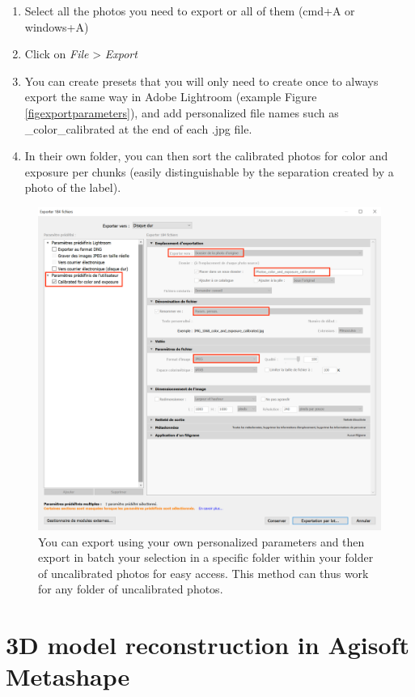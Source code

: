 \documentclass[
]{book}
\begin{document}
\begin{enumerate}
\def\labelenumi{\arabic{enumi}.}
\item
  Select all the photos you need to export or all of them (cmd+A or
  windows+A)
\item
  Click on \emph{File} \textgreater{} \emph{Export}
\item
  You can create presets that you will only need to create once to
  always export the same way in Adobe Lightroom (example Figure \ref{figexportparameters}), and add personalized file names
  such as \_color\_calibrated at the end of each .jpg file.
\item
  In their own folder, you can then sort the calibrated photos for
  color and exposure per chunks (easily distinguishable by the
  separation created by a photo of the label).
\end{enumerate}

\begin{figure}

{\centering \includegraphics[width=0.8\linewidth]{Figures/export_capture_1} 

}

\caption{You can export using your own personalized parameters and then export in batch your selection in a specific folder within your folder of uncalibrated photos for easy access. This method can thus work for any folder of uncalibrated photos.}\label{fig:exportparameters}
\end{figure}

\hypertarget{d-model-reconstruction-in-agisoft-metashape}{%
\chapter{3D model reconstruction in Agisoft Metashape}\label{d-model-reconstruction-in-agisoft-metashape}}
\end{document}
